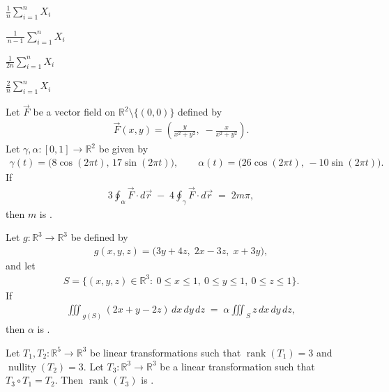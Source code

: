 \documentclass[journal,12pt,onecolumn]{IEEEtran}
\theoremstyle{remark}
\begin{document}
\begin{enumerate}
{\begin{enumerate}
\begin{multicols}{2}
\item $\displaystyle \frac{1}{n}\sum_{i=1}^{n}X_i$
\item $\displaystyle \frac{1}{\,n-1\,}\sum_{i=1}^{n}X_i$
\item $\displaystyle \frac{1}{2n}\sum_{i=1}^{n}X_i$
\item $\displaystyle \frac{2}{n}\sum_{i=1}^{n}X_i$
\end{multicols}
\end{enumerate}
\item Let $\vec F$ be a vector field on $\mathbb{R}^2\setminus\{(0,0)\}$ defined by
\begin{align*}
\vec F(x,y)=\left(\frac{y}{x^{2}+y^{2}},\;-\frac{x}{x^{2}+y^{2}}\right).
\end{align*}
Let $\gamma,\alpha:[0,1]\to\mathbb{R}^{2}$ be given by
\begin{align*}
\gamma(t)=\bigl(8\cos(2\pi t),\,17\sin(2\pi t)\bigr),\qquad
\alpha(t)=\bigl(26\cos(2\pi t),\,-10\sin(2\pi t)\bigr).
\end{align*}
If
\begin{align*}
3\oint_{\alpha}\vec F\cdot d\vec r\;-\;4\oint_{\gamma}\vec F\cdot d\vec r \;=\;2m\pi,
\end{align*}
then $m$ is \underline{\hspace{1.6cm}}.

\hfill{}

\item Let $g:\mathbb{R}^{3}\to\mathbb{R}^{3}$ be defined by
\begin{align*}
g(x,y,z)=\bigl(3y+4z,\;2x-3z,\;x+3y\bigr),
\end{align*}
and let
\begin{align*}
S=\{(x,y,z)\in\mathbb{R}^{3}:\ 0\le x\le1,\ 0\le y\le1,\ 0\le z\le1\}.
\end{align*}
If
\begin{align*}
\iiint_{\,g(S)} \!\!(2x+y-2z)\,dx\,dy\,dz
\;=\;
\alpha\!\iiint_{\,S}\! z\,dx\,dy\,dz,
\end{align*}
then $\alpha$ is \underline{\hspace{2.2cm}}.

\hfill{}

\item Let $T_{1},T_{2}:\mathbb{R}^{5}\to\mathbb{R}^{3}$ be linear transformations such that
$\operatorname{rank}(T_{1})=3$ and $\operatorname{nullity}(T_{2})=3$.  
Let $T_{3}:\mathbb{R}^{3}\to\mathbb{R}^{3}$ be a linear transformation such that
$T_{3}\circ T_{1}=T_{2}$.  
Then $\operatorname{rank}(T_{3})$ is \underline{\hspace{2.8cm}}.

}
\end{enumerate}
\end{document}
